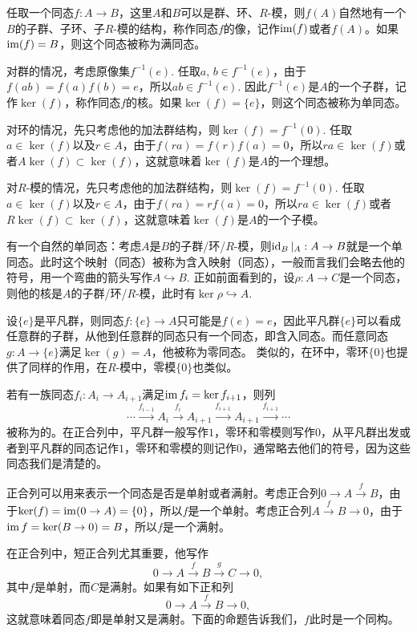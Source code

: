 \para 任取一个同态$f:A\to B$，这里$A$和$B$可以是群、环、$R$-模，则$f(A)$自然地有一个$B$的子群、子环、子$R$-模的结构，称作同态$f$的像，记作$\operatorname{im}(f)$或者$f(A)$。如果$\operatorname{im}(f)=B$，则这个同态被称为满同态。

对群的情况，考虑原像集$f^{-1}(e)$. 任取$a$, $b\in f^{-1}(e)$，由于$f(ab)=f(a)f(b)=e$，所以$ab\in f^{-1}(e)$. 因此$f^{-1}(e)$是$A$的一个子群，记作$\ker(f)$，称作同态$f$的核。如果$\ker(f)=\{e\}$，则这个同态被称为单同态。

对环的情况，先只考虑他的加法群结构，则$\ker(f)=f^{-1}(0)$. 任取$a\in \ker(f)$以及$r\in A$，由于$f(ra)=f(r)f(a)=0$，所以$ra\in \ker(f)$或者$A\ker(f)\subset \ker(f)$，这就意味着$\ker(f)$是$A$的一个理想。

对$R$-模的情况，先只考虑他的加法群结构，则$\ker(f)=f^{-1}(0)$. 任取$a\in \ker(f)$以及$r\in A$，由于$f(ra)=rf(a)=0$，所以$ra\in \ker(f)$或者$R\ker(f)\subset \ker(f)$，这就意味着$\ker(f)$是$A$的一个子模。

\para 有一个自然的单同态：考虑$A$是$B$的子群/环/$R$-模，则$\operatorname{id}_B|_A:A\to B$就是一个单同态。此时这个映射（同态）被称为含入映射（同态），一般而言我们会略去他的符号，用一个弯曲的箭头写作$A\hookrightarrow B$. 正如前面看到的，设$\rho:A\to C$是一个同态，则他的核是$A$的子群/环/$R$-模，此时有$\ker\rho\hookrightarrow A$.

设$\{e\}$是平凡群，则同态$f:\{e\}\to A$只可能是$f(e)=e$，因此平凡群$\{e\}$可以看成任意群的子群，从他到任意群的同态只有一个同态，即含入同态。而任意同态$g:A\to \{e\}$满足$\ker(g)=A$，他被称为零同态。 类似的，在环中，零环$\{0\}$也提供了同样的作用，在$R$-模中，零模$\{0\}$也类似。

\para 若有一族同态$f_i:A_i\to A_{i+1}$满足$\operatorname{im} f_i=\ker f_{i+1}$，则列
\[
	\cdots \xrightarrow{f_{i-1}}A_i \xrightarrow{f_i} A_{i+1} \xrightarrow{f_{i+1}} A_{i+1}\xrightarrow{f_{i+1}}\cdots
\]
被称为的。在正合列中，平凡群一般写作$1$，零环和零模则写作$0$，从平凡群出发或者到平凡群的同态记作$1$，零环和零模的则记作$0$，通常略去他们的符号，因为这些同态我们是清楚的。

正合列可以用来表示一个同态是否是单射或者满射。考虑正合列$0\to A\xrightarrow{f} B$，由于$\ker(f)=\operatorname{im}(0\to A)=\{0\}$，所以$f$是一个单射。考虑正合列$A\xrightarrow{f} B\to 0$，由于$\operatorname{im} f=\ker(B\to 0)=B$，所以$f$是一个满射。

在正合列中，短正合列尤其重要，他写作
\[
	0\to A \xrightarrow{f} B \xrightarrow{g} C\to 0,
\]
其中$f$是单射，而$C$是满射。如果有如下正和列
\[
	0\to A \xrightarrow{f} B \to 0,
\]
这就意味着同态$f$即是单射又是满射。下面的命题告诉我们，$f$此时是一个同构。

